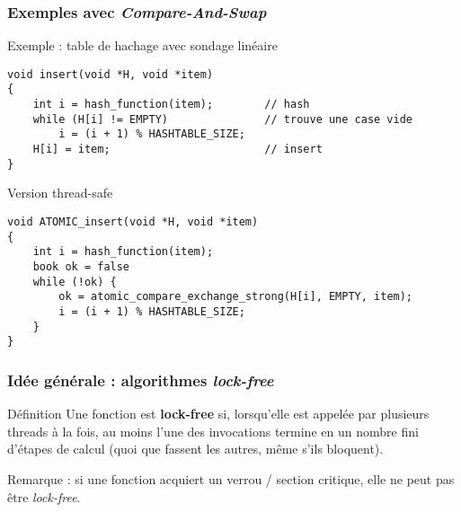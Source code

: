 \documentclass[xcolor={x11names,svgnames},x11names,svgnames]{beamer}
\begin{document}
\begin{frame}[fragile, label=CAS_hash]
  \frametitle{Exemples avec \emph{Compare-And-Swap}}

  \begin{exampleblock}{Exemple : table de hachage avec sondage linéaire}
\begin{verbatim}
void insert(void *H, void *item)
{
    int i = hash_function(item);        // hash
    while (H[i] != EMPTY)               // trouve une case vide
        i = (i + 1) % HASHTABLE_SIZE;        
    H[i] = item;                        // insert
}
\end{verbatim}
  \end{exampleblock}

\medskip
  
  \begin{alertblock}{Version thread-safe}
\begin{verbatim}
void ATOMIC_insert(void *H, void *item)
{
    int i = hash_function(item);
    book ok = false
    while (!ok) {
        ok = atomic_compare_exchange_strong(H[i], EMPTY, item);
        i = (i + 1) % HASHTABLE_SIZE;        
    }
}
\end{verbatim}
  \end{alertblock}
\end{frame}


\begin{frame}[label=lock-free-defs]
  \frametitle{Idée générale : algorithmes \emph{lock-free}}

  \begin{block}{Définition}
    Une fonction est \textbf{lock-free} si, lorsqu'elle est appelée par plusieurs
    threads à la fois, au moins l'une des invocations termine en un nombre fini
    d'étapes de calcul (quoi que fassent les autres, même s'ils bloquent).
  \end{block}

  \bigskip
  
  Remarque : si une fonction acquiert un verrou / section critique, elle ne peut
  pas être \emph{lock-free}.

  \pause\bigskip
  

\end{frame}
\end{document}
